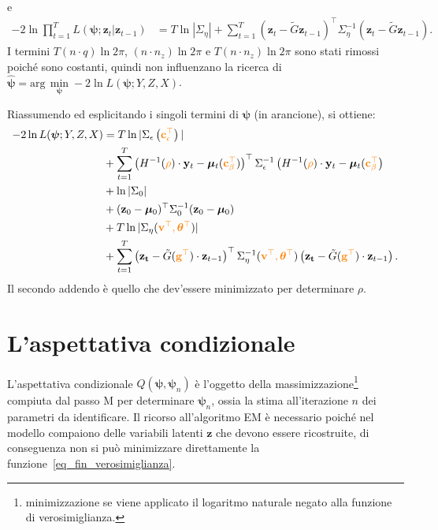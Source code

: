 e
\begin{equation}
	\begin{split}
		- 2\ln\prod_{t=1}^{T} L(\boldsymbol{\psi}; \mathbf{z}_t|\mathbf{z}_{t-1}) & = T\ln|\Sigma_\eta| +\sum_{t=1}^{T} \left(\mathbf{z}_t - \tilde{G}\mathbf{z}_{t-1} \right)^\top\Sigma_\eta^{-1}\left(\mathbf{z}_t - \tilde{G}\mathbf{z}_{t-1} \right).
	\end{split}
\end{equation}
I termini $T(n\cdot q)\ln 2\pi$, $(n\cdot n_z)\ln 2\pi$ e $T(n\cdot n_z)\ln 2\pi$ sono stati rimossi poiché sono costanti, quindi non influenzano la ricerca di $\hat{\boldsymbol{\psi}}=\text{arg}\,\min\limits_{\boldsymbol{\psi}} -2\ln L(\boldsymbol{\psi}; Y, Z, X)$. \par Riassumendo ed esplicitando i singoli termini di $\boldsymbol{\psi}$ (in arancione), si ottiene:
\begin{equation}
	\begin{split}
		-2\ln L(\boldsymbol{\psi}; Y, Z, X) & =  T\ln|\Sigma_\epsilon\left(\textcolor{orange}{\mathbf{c}_\epsilon^\top}\right)| \\
		& + \sum_{t=1}^{T} \left(H^{-1}(\textcolor{orange}{\rho})\cdot\mathbf{y}_t - \boldsymbol{\mu}_t(\textcolor{orange}{\mathbf{c}_\beta^\top})\right)^\top\Sigma_\epsilon^{-1}\left(H^{-1}(\textcolor{orange}{\rho})\cdot\mathbf{y}_t - \boldsymbol{\mu}_t(\textcolor{orange}{\mathbf{c}_\beta^\top}\right) \\
		& + \ln|\Sigma_0| \\
		& + (\mathbf{z}_0 - \boldsymbol{\mu}_0)^\top\Sigma_0^{-1}(\mathbf{z}_0 - \boldsymbol{\mu}_0) \\
		& + T\ln |\Sigma_\eta(\textcolor{orange}{\mathbf{v}^\top,\boldsymbol{\theta}^\top})| \\
		& + \sum_{t=1}^{T}\left(\mathbf{z_t}-\tilde{G}(\textcolor{orange}{\mathbf{g}^\top})\cdot\mathbf{z}_{t-1}\right)^\top\Sigma_\eta^{-1}(\textcolor{orange}{\mathbf{v}^\top,\boldsymbol{\theta}^\top})\left(\mathbf{z_t}-\tilde{G}(\textcolor{orange}{\mathbf{g}^\top})\cdot\mathbf{z}_{t-1}\right).
	\end{split}
	\label{eq_fin_verosimiglianza}
\end{equation}
Il secondo addendo è quello che dev'essere minimizzato per determinare $\rho$.

\section[L'aspettativa condizionale]{L'aspettativa condizionale}
L'aspettativa condizionale $Q(\boldsymbol{\psi}, \boldsymbol{\psi}_n)$ è l'oggetto della massimizzazione\footnote{minimizzazione se viene applicato il logaritmo naturale negato alla funzione di verosimiglianza.} compiuta dal passo M per determinare $\boldsymbol{\psi}_n$, ossia la stima all'iterazione $n$ dei parametri da identificare. Il ricorso all'algoritmo EM è necessario poiché nel modello compaiono delle variabili latenti $\mathbf{z}$ che devono essere ricostruite, di conseguenza non si può minimizzare direttamente la funzione~\ref{eq_fin_verosimiglianza}.

